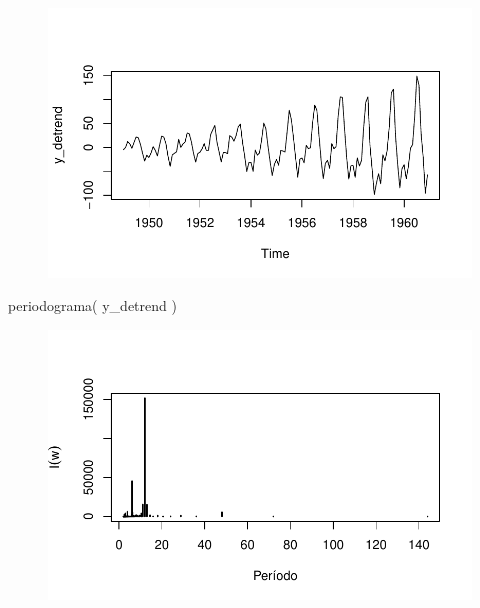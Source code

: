 \documentclass[
  letterpaper,
  DIV=11,
  numbers=noendperiod]{scrreprt}
\newenvironment{Shaded}{\begin{snugshade}}{\end{snugshade}}
\newcommand{\FunctionTok}[1]{\textcolor[rgb]{0.28,0.35,0.67}{#1}}
\newcommand{\NormalTok}[1]{\textcolor[rgb]{0.00,0.23,0.31}{#1}}
\begin{document}
\begin{figure}[H]

{\centering \includegraphics{ferramentas_files/figure-pdf/unnamed-chunk-14-1.pdf}

}

\end{figure}

\begin{Shaded}
\begin{Highlighting}[]
\FunctionTok{periodograma}\NormalTok{( y\_detrend )}
\end{Highlighting}
\end{Shaded}

\begin{figure}[H]

{\centering \includegraphics{ferramentas_files/figure-pdf/unnamed-chunk-14-2.pdf}

}

\end{figure}
\end{document}
